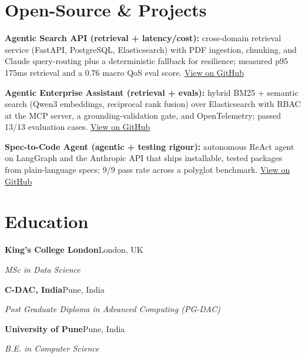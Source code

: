 \documentclass[10pt,a4paper]{article}
\begin{document}
\section{Open-Source \& Projects}
\begin{tight}
  \item \textbf{Agentic Search API (retrieval + latency/cost):} cross-domain retrieval service (FastAPI, PostgreSQL, Elasticsearch) with PDF ingestion, chunking, and Claude query-routing plus a deterministic fallback for resilience; measured p95 175ms retrieval and a 0.76 macro QoS eval score. \href{https://github.com/abhijeetscode/search-agent}{View on GitHub}
  \item \textbf{Agentic Enterprise Assistant (retrieval + evals):} hybrid BM25 + semantic search (Qwen3 embeddings, reciprocal rank fusion) over Elasticsearch with RBAC at the MCP server, a grounding-validation gate, and OpenTelemetry; passed 13/13 evaluation cases. \href{https://github.com/abhijeetscode/Agentic-Enterprise-Assistant}{View on GitHub}
  \item \textbf{Spec-to-Code Agent (agentic + testing rigour):} autonomous ReAct agent on LangGraph and the Anthropic API that ships installable, tested packages from plain-language specs; 9/9 pass rate across a polyglot benchmark. \href{https://github.com/abhijeetscode/Spec-to-Code-Agent}{View on GitHub}
\end{tight}

\section{Education}
{\color{company}\bfseries King's College London}\hfill {\color{muted}London, UK}\par
{\itshape MSc in Data Science}\par\vspace{2pt}
{\color{company}\bfseries C-DAC, India}\hfill {\color{muted}Pune, India}\par
{\itshape Post Graduate Diploma in Advanced Computing (PG-DAC)}\par\vspace{2pt}
{\color{company}\bfseries University of Pune}\hfill {\color{muted}Pune, India}\par
{\itshape B.E. in Computer Science}\par
\end{document}
